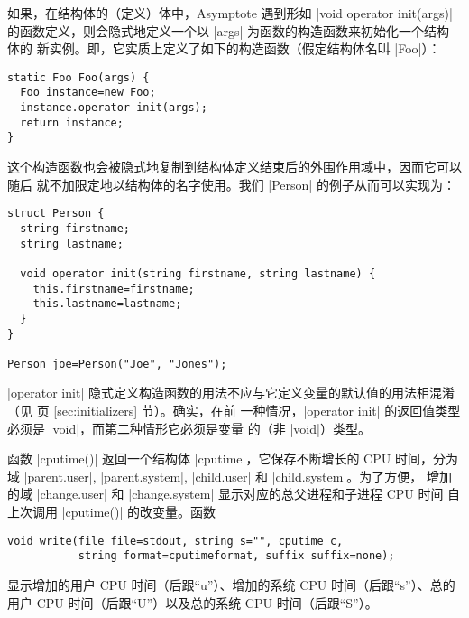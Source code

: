 \documentclass[nofonts,CJKnormalspaces]{ctexbook}[2009/05/20]
\begin{document}
如果，在结构体的（定义）体中，Asymptote 遇到形如 |void operator init(args)|
的函数定义，则会隐式地定义一个以 |args| 为函数的构造函数来初始化一个结构体的
新实例。即，它实质上定义了如下的构造函数（假定结构体名叫 |Foo|）：
\begin{lstlisting}
static Foo Foo(args) {
  Foo instance=new Foo;
  instance.operator init(args);
  return instance;
}
\end{lstlisting}
\lstset{emph=}

这个构造函数也会被隐式地复制到结构体定义结束后的外围作用域中，因而它可以随后
就不加限定地以结构体的名字使用。我们 |Person| 的例子从而可以实现为：
\begin{lstlisting}
struct Person {
  string firstname;
  string lastname;

  void operator init(string firstname, string lastname) {
    this.firstname=firstname;
    this.lastname=lastname;
  }
}

Person joe=Person("Joe", "Jones");
\end{lstlisting}

|operator init| 隐式定义构造函数的用法不应与它定义变量的默认值的用法相混淆
（见 \pageref{sec:initializers} 页 \ref{sec:initializers} 节）。确实，在前
一种情况，|operator init| 的返回值类型必须是 |void|，而第二种情形它必须是变量
的（非 |void|）类型。

函数 |cputime()| 返回一个结构体 |cputime|，它保存不断增长的 CPU 时间，分为域
|parent.user|, |parent.system|, |child.user| 和 |child.system|。为了方便，
增加的域 |change.user| 和 |change.system| 显示对应的总父进程和子进程 CPU 时间
自上次调用 |cputime()| 的改变量。函数
\begin{lstlisting}
void write(file file=stdout, string s="", cputime c,
           string format=cputimeformat, suffix suffix=none);
\end{lstlisting}
显示增加的用户 CPU 时间（后跟“u”）、增加的系统 CPU 时间（后跟“s”）、总的
用户 CPU 时间（后跟“U”）以及总的系统 CPU 时间（后跟“S”）。
\end{document}
